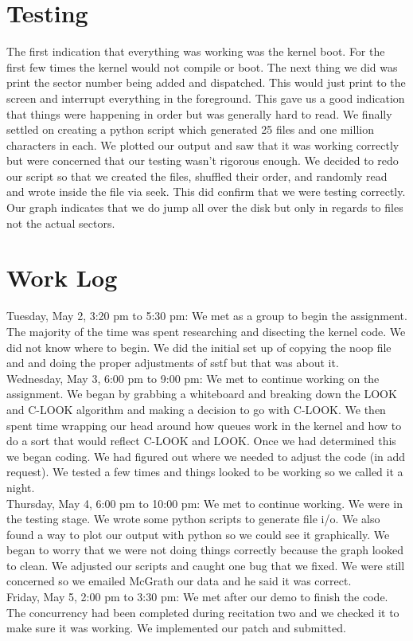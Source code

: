 \documentclass[letterpaper,10pt,serif,draftclsnofoot,onecolumn,compsoc,titlepage]{IEEEtran}
\begin{document}
\section{Testing}
The first indication that everything was working was the kernel boot. For
the first few times the kernel would not compile or boot. The next thing
we did was print the sector number being added and dispatched. This would
just print to the screen and interrupt everything in the foreground.
This gave us a good indication that things were happening in order but
was generally hard to read. We finally settled on creating a python
script which generated 25 files and one million characters in
each. We plotted our output and saw that it was working correctly but were
concerned that our testing wasn't rigorous enough. We decided to redo our
script so that we created the files, shuffled their order, and randomly
read and wrote inside the file via seek. This did confirm that we were
testing correctly. Our graph indicates that we do jump all over the disk
but only in regards to files not the actual sectors.
\section{Work Log}
Tuesday, May 2, 3:20 pm to 5:30 pm: We met as a group to begin the
assignment. The majority of the time was spent researching and disecting
the kernel code. We did not know where to begin. We did the initial set up
of copying the noop file and and doing the proper adjustments of sstf but
that was about it. \\
Wednesday, May 3, 6:00 pm to 9:00 pm: We met to continue working on
the assignment. We began by grabbing a whiteboard and breaking down the
LOOK and C-LOOK algorithm and making a decision to go with C-LOOK. We
then spent time wrapping our head around how queues work in the kernel
and how to do a sort that would reflect C-LOOK and LOOK. Once we had
determined this we began coding. We had figured out where we needed to
adjust the code (in add request). We tested a few times and things looked
to be working so we called it a night. \\
Thursday, May 4, 6:00 pm to 10:00 pm: We met to continue working. We were
in the testing stage. We wrote some python scripts to generate file i/o.
We also found a way to plot our output with python so we could see it
graphically. We began to worry that we were not doing things correctly
because the graph looked to clean. We adjusted our scripts and caught
one bug that we fixed. We were still concerned so we emailed McGrath our
data and he said it was correct.\\
Friday, May 5, 2:00 pm to 3:30 pm: We met after our demo to finish the
code. The concurrency had been completed during recitation two and we
 checked it to make sure it was working. We implemented our patch
  and submitted. \\
\end{document}
